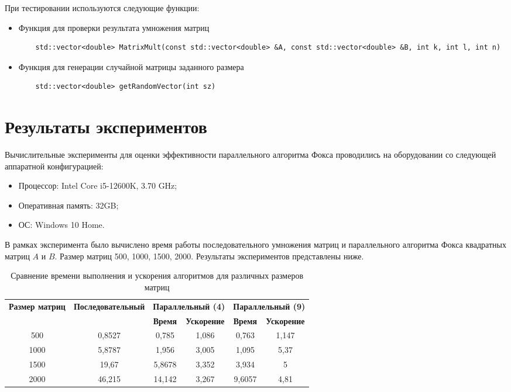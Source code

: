 \documentclass{report}
\begin{document}
При тестировании используются следующие функции:
\begin{itemize}
    \item Функция для проверки результата умножения матриц
    \begin{lstlisting}
    std::vector<double> MatrixMult(const std::vector<double> &A, const std::vector<double> &B, int k, int l, int n)
    \end{lstlisting}
    \item Функция для генерации случайной матрицы заданного размера
    \begin{lstlisting}
    std::vector<double> getRandomVector(int sz)
    \end{lstlisting}
\end{itemize}
\newpage

\section*{Результаты экспериментов}
Вычислительные эксперименты для оценки эффективности параллельного алгоритма Фокса проводились на оборудовании со следующей аппаратной конфигурацией:

\begin{itemize}
\item Процессор: Intel Core i5-12600K, 3.70 GHz;
\item Оперативная память: 32GB;
\item ОС: Windows 10 Home.
\end{itemize}

\par В рамках эксперимента было вычислено время работы последовательного умножения матриц и параллельного алгоритма Фокса квадратных матриц {\itshape $A$} и {\itshape $B$}. Размер матриц 500, 1000, 1500, 2000. Результаты экспериментов представлены ниже.

\begin{table}[h!]
\centering
\caption{Сравнение времени выполнения и ускорения алгоритмов для различных размеров матриц}
\begin{tabular}{|c|c|c|c|c|c|}
\hline
\multirow{2}{*}{\textbf{Размер матриц}} & \multirow{2}{*}{\textbf{Последовательный}} & \multicolumn{2}{c|}{\textbf{Параллельный (4)}} & \multicolumn{2}{c|}{\textbf{Параллельный (9)}} \\ \cline{3-6} 
 &  & \textbf{Время} & \textbf{Ускорение} & \textbf{Время} & \textbf{Ускорение} \\ \hline
500 & 0,8527 & 0,785 & 1,086 & 0,763 & 1,147 \\ \hline
1000 & 5,8787 & 1,956 & 3,005 & 1,095 & 5,37 \\ \hline
1500 & 19,67 & 5,8678 & 3,352 & 3,934 & 5 \\ \hline
2000 & 46,215 & 14,142 & 3,267 & 9,6057 & 4,81 \\ \hline
\end{tabular}
\label{tab:comparison}
\end{table}
\end{document}

